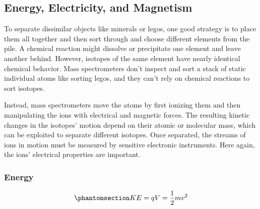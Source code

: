 \documentclass[
  letterpaper,
  DIV=11,
  numbers=noendperiod]{scrreprt}
\begin{document}
\subsection{Energy, Electricity, and
Magnetism}\label{energy-electricity-and-magnetism}

To separate dissimilar objects like minerals or legos, one good strategy
is to place them all together and then sort through and choose different
elements from the pile. A chemical reaction might dissolve or
precipitate one element and leave another behind. However, isotopes of
the same element have nearly identical chemical behavior. Mass
spectrometers don't inspect and sort a stack of static individual atoms
like sorting legos, and they can't rely on chemical reactions to sort
isotopes.

Instead, mass spectrometers move the atoms by first ionizing them and
then manipulating the ions with electrical and magnetic forces. The
resulting kinetic changes in the isotopes' motion depend on their atomic
or molecular mass, which can be exploited to separate different
isotopes. Once separated, the streams of ions in motion must be measured
by sensitive electronic instruments. Here again, the ions' electrical
properties are important.

\subsubsection{Energy}\label{energy}

\begin{equation}\phantomsection\label{eq-kinetic_energy}{
KE = qV = \dfrac{1}{2}mv^2
}\end{equation}
\end{document}
